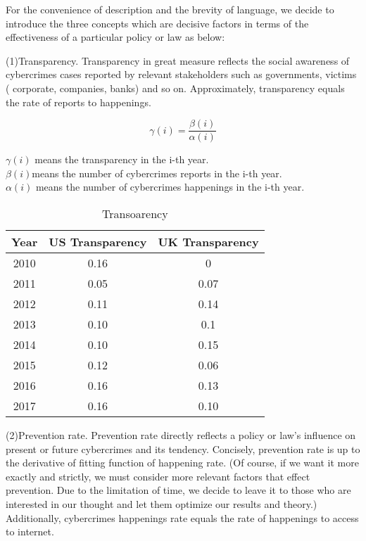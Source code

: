 \documentclass[12pt]{article}
\begin{document}
	 For the convenience of description and the brevity of language, we decide to introduce the three concepts which are decisive factors in terms of the effectiveness of a particular policy or law as below:
	 
	 (1)Transparency. Transparency in great measure reflects the social awareness of cybercrimes cases reported by relevant stakeholders such as governments, victims ( corporate, companies, banks) and so on. Approximately, transparency equals the rate of reports to happenings.
	 
	 
	 
	 \[ \gamma(i) = \frac{\beta(i)}{\alpha(i)}\]
	 \begin{center}
	 	$\gamma(i)$ means the transparency in the i-th year.\\
	 	$\beta(i)$means the number of cybercrimes reports in the i-th year.\\
	 	$\alpha(i)$ means the number of cybercrimes happenings in the i-th year.
	 \end{center}

	\begin{table}[H]
		\centering
		\caption{Transoarency}
		\label{tab:Transparency}
		\begin{tabular}{|c|c|c|}
			
			\hline
			Year & US Transparency & UK Transparency\\
			\hline
			2010 & 0.16 & 0 \\
			\hline
			2011 & 0.05 & 0.07 \\
			\hline
			2012 & 0.11 & 0.14 \\
			\hline
			2013 & 0.10 & 0.1\\
			\hline
			2014& 0.10 & 0.15\\
			\hline
			2015& 0.12 & 0.06\\
			\hline
			2016& 0.16 & 0.13\\
			\hline
			2017& 0.16 & 0.10\\
			\hline
			
		\end{tabular}
		
	\end{table}
	 
	 
	 
	 
	 (2)Prevention rate. Prevention rate directly reflects a policy or law’s influence on present or future cybercrimes and its tendency. Concisely, prevention rate is up to the derivative of fitting function of happening rate. (Of course, if we want it more exactly and strictly, we must consider more relevant factors that effect prevention. Due to the limitation of time, we decide to leave it to those who are interested in our thought and let them optimize our results and theory.) Additionally, cybercrimes happenings rate equals the rate of happenings to access to internet.
	 
\end{document}
